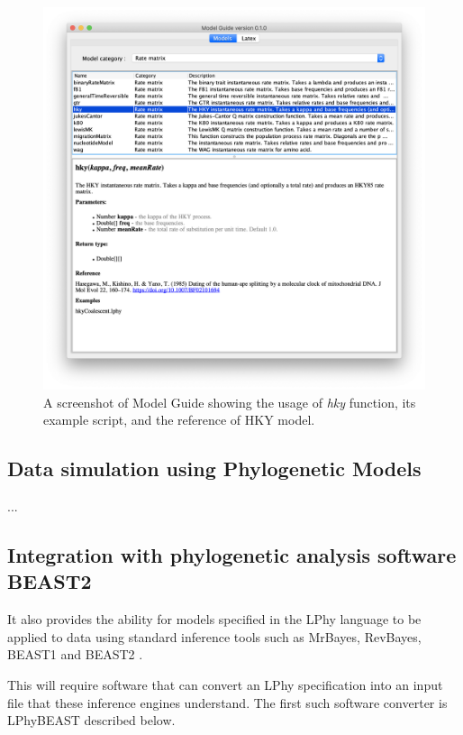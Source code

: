 \documentclass[10pt,letterpaper,table]{article}
\begin{document}
{\begin{figure}
  \includegraphics[width=\textwidth]{figs/modelguide.png}
  \caption{A screenshot of Model Guide showing the usage of \emph{hky} function, its example script, and the reference of HKY model.} 
  \label{fig:modelguide}
\end{figure}


\subsection*{Data simulation using Phylogenetic Models}
...




\subsection*{Integration with phylogenetic analysis software BEAST2}

It also provides the ability for models specified in the LPhy language to be applied to data using standard inference tools
such as MrBayes, RevBayes, BEAST1 and BEAST2
\cite{bouckaert2014beastanalysis,DrummondBouckaert2015,bouckaert2019beastanalysis}.

This will require software that can convert an LPhy specification into
an input file that these inference engines understand.
The first such software converter is LPhyBEAST described below.


}
\end{document}
